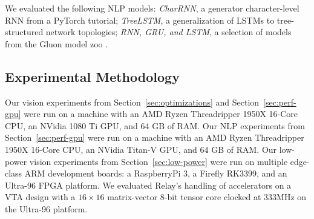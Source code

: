  We evaluated the following NLP models:
    \textit{CharRNN}, a generator character-level
    RNN from a PyTorch tutorial;
    \textit{TreeLSTM}, a generalization of LSTMs to
    tree-structured network topologies;
    \textit{RNN, GRU, and LSTM}, a selection of models from the Gluon
    model zoo
    \citep{pytorch_rnn_tut, tree_lstm, gluon_model_zoo}.

  \subsection{Experimental Methodology}


  Our vision experiments from Section~\ref{sec:optimizations} and Section~\ref{sec:perf-gpu} were run on a machine with an AMD Ryzen
    Threadripper 1950X 16-Core CPU,
    an NVidia 1080 Ti GPU,
    and 64 GB of RAM.
  Our NLP experiments from Section~\ref{sec:perf-gpu} were run on a machine with an AMD Ryzen
    Threadripper 1950X 16-Core CPU,
    an NVidia Titan-V GPU,
    and 64 GB of RAM.
  Our low-power vision experiments from Section~\ref{sec:low-power} were run on multiple edge-class ARM development boards: a RaspberryPi 3, a Firefly RK3399, and an Ultra-96 FPGA platform.
  We evaluated Relay's handling of accelerators on a VTA design with a
    $16\times16$ matrix-vector 8-bit tensor core clocked at 333MHz on the Ultra-96 platform.


